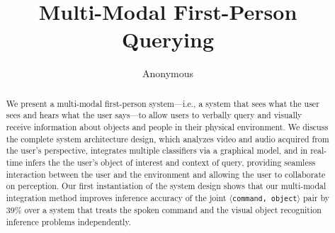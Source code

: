 \documentclass{llncs}
\begin{document}
%

\mainmatter              %
%




\title{\large Multi-Modal First-Person Querying}
%
%
\author{
Anonymous
%
%
%
}
\maketitle              %

\begin{abstract}
We present a multi-modal first-person system---i.e., a system that
sees what the user sees and hears what the user says---to allow users
to verbally query and visually receive information about objects and
people in their physical environment. We discuss the complete system
architecture design, which analyzes video and audio acquired from the
user's perspective, integrates multiple classifiers via a graphical
model, and in real-time infers the the user's object of interest and
context of query, providing seamless interaction between the user and
the environment and allowing the user to collaborate on
perception. Our first instantiation of the system design shows that
our multi-modal integration method improves inference accuracy of the
joint $\langle$\texttt{command, object}$\rangle$ pair by $39\%$ over a
system that treats the spoken command and the visual object
recognition inference problems independently.
\end{abstract}
\end{document}
